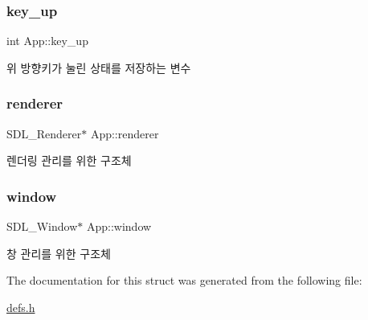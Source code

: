 \subsubsection{\texorpdfstring{key\+\_\+up}{key\_up}}
{\footnotesize\ttfamily int App\+::key\+\_\+up}

위 방향키가 눌린 상태를 저장하는 변수 \mbox{\label{struct_app_a4ad29ac304e4ece3ddf9f275fb30f29d}} 
\subsubsection{\texorpdfstring{renderer}{renderer}}
{\footnotesize\ttfamily S\+D\+L\+\_\+\+Renderer$\ast$ App\+::renderer}

렌더링 관리를 위한 구조체 \mbox{\label{struct_app_a47d24f96ee9543f2a5f444918347b76b}} 
\subsubsection{\texorpdfstring{window}{window}}
{\footnotesize\ttfamily S\+D\+L\+\_\+\+Window$\ast$ App\+::window}

창 관리를 위한 구조체 

The documentation for this struct was generated from the following file\+:\begin{DoxyCompactItemize}
\item 
\hyperlink{defs_8h}{defs.\+h}\end{DoxyCompactItemize}
